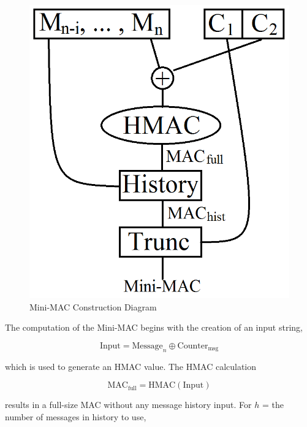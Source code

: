 	\begin{figure}
		\centering
		\includegraphics[width=\columnwidth]{figures/minimac_diagram.png}
		\caption{Mini-MAC Construction Diagram}
	\end{figure}


The computation of the Mini-MAC begins with the creation of an input string, 

\begin{equation}
\text{Input} = \text{Message}_n\oplus\text{Counter}_{\text{msg}}
\end{equation}

which is used to generate an HMAC value. The HMAC calculation 

\begin{equation}
\text{MAC}_{\text{full}} = \text{HMAC}(\text{Input})
\end{equation}

results in a full-size MAC without any message history input. For $h$ = the number of messages in history to use, 

